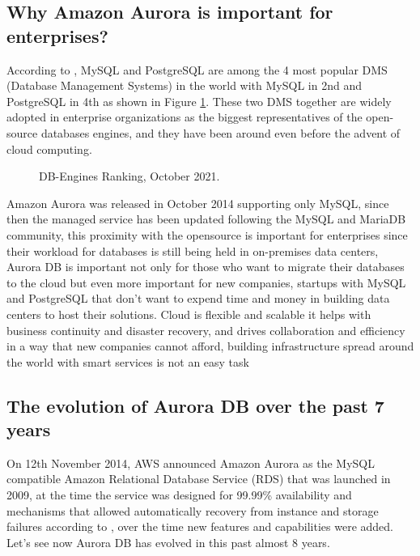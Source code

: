 \documentclass{article}
\begin{document}
\subsection{Why Amazon Aurora is important for enterprises?}
According to \cite{dbengineers2021}, MySQL and PostgreSQL are among the 4 most popular DMS (Database Management Systems) in the world with MySQL in 2nd and PostgreSQL in 4th as shown in Figure \ref{fig:DBRanking}. These two DMS together are widely adopted in enterprise organizations as the biggest representatives of the open-source databases engines, and they have been around even before the advent of cloud computing. 

\begin{figure}[hbt!]
\centering
\caption{\label{fig:DBRanking}DB-Engines Ranking, October 2021.}
\end{figure}

Amazon Aurora was released in October 2014 supporting only MySQL, since then the managed service has been updated following the MySQL and MariaDB community, this proximity with the opensource is important for enterprises since their workload for databases is still being held in on-premises data centers, Aurora DB is important not only for those who want to migrate their databases to the cloud but even more important for new companies, startups with MySQL and PostgreSQL that don’t want to expend time and money in building data centers to host their solutions. Cloud is flexible and scalable it helps with business continuity and disaster recovery, and drives collaboration and efficiency in a way that new companies cannot afford, building infrastructure spread around the world with smart services is not an easy task \cite{mihalec2021}

\subsection{The evolution of Aurora DB over the past 7 years }

On 12th November 2014, AWS announced Amazon Aurora as the MySQL compatible Amazon Relational Database Service (RDS) that was launched in 2009, at the time the service was designed for 99.99\% availability and mechanisms that allowed automatically recovery from instance and storage failures according to \cite{jeffbarr2014}, over the time new features and capabilities were added. Let’s see now Aurora DB has evolved in this past almost 8 years. 
\end{document}

